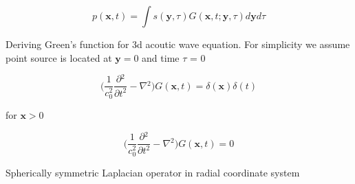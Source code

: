 \documentclass{article}
\begin{document}
\begin{equation*}
    p(\mathbf{x}, t) = \int s(\mathbf{y}, \tau){G(\mathbf{x}, t; \mathbf{y}, \tau )} d\mathbf{y}d\tau 
\end{equation*}

Deriving Green's function for 3d acoutic wave equation. For simplicity we assume point source is located at $\mathbf{y} = 0$ and time $\tau$ = 0

\begin{equation}
    \Bigg( \frac{1}{c_{0}^2}\frac{\partial{}^{2}}{\partial{t}^{2}}- \nabla{}^{2} \Bigg){G(\mathbf{x}, t )} = \delta{(\mathbf{x})}\delta{(t)} 
\end{equation}

for $\mathbf{x} > 0$ 

\begin{equation}
    \Bigg( \frac{1}{c_{0}^2}\frac{\partial{}^{2}}{\partial{t}^{2}}- \nabla{}^{2} \Bigg){G(\mathbf{x}, t )} = 0 
\end{equation}

Spherically symmetric Laplacian operator in radial coordinate system
\end{document}

